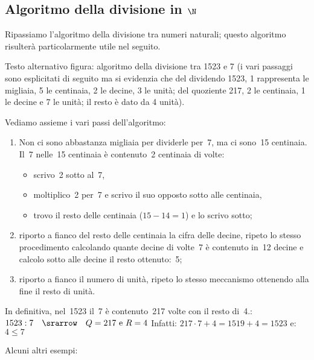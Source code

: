 
\subsection{Algoritmo della divisione in \texorpdfstring{$\N$}{N}}

Ripassiamo l'algoritmo della divisione tra numeri naturali; 
questo algoritmo risulterà particolarmente utile nel seguito.

\vspace{-1.5em}
\immagine
{Testo alternativo figura: algoritmo della divisione tra 1523 e 7 
(i vari passaggi sono esplicitati di seguito ma si evidenzia che del 
dividendo 1523, 1 rappresenta le migliaia, 5 le centinaia, 2 le decine, 
3 le unità; 
del quoziente 217, 2 le centinaia, 1 le decine e 7 le unità; 
il resto è dato da 4 unità).}
{\divisinta}
\vspace{-2.5em}

Vediamo assieme i vari passi dell'algoritmo:
\begin{enumerate} [nosep]
\item Non ci sono abbastanza migliaia per dividerle per~7, ma ci sono~15 
centinaia. 
Il~7 nelle~15 centinaia è contenuto~2 centinaia di volte:
  \begin{itemize} [nosep]
  \item scrivo~2 sotto al~7,
  \item moltiplico~2 per~7 e scrivo il suo opposto sotto alle centinaia,
  \item trovo il resto delle centinaia (\(15-14=1\)) e lo scrivo sotto;
  \end{itemize}
\item riporto a fianco del resto delle centinaia la cifra delle decine, 
ripeto lo stesso procedimento calcolando quante decine di volte~7 è 
contenuto in~12 decine e calcolo sotto alle decine il resto ottenuto:~5;
\item riporto a fianco il numero di unità, ripeto lo stesso meccanismo 
ottenendo alla fine il resto di unità.
\end{enumerate}
In definitiva, nel~1523 il~7 è contenuto~217 volte con il resto di~4.:\\
\(1523:7 \quad \srarrow \quad Q=217 \text{ e } R=4\) \quad
Infatti: \(217 \cdot 7 + 4 = 1519 + 4 = 1523\)
e: \(4 \leqslant 7\)

Alcuni altri esempi:


